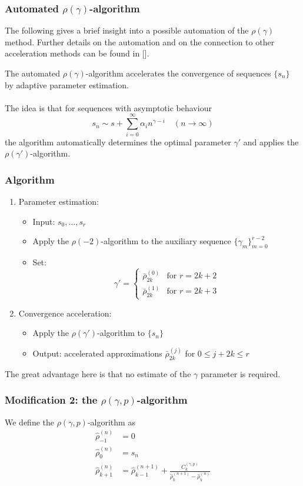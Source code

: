 \documentclass[a4paper,12pt]{article}
\numberwithin{equation}{section}
\theoremstyle{remark}
\begin{document}
\subsubsection{Automated $\rho(\gamma)$-algorithm}
The following gives a brief insight into a possible automation of the $\rho(\gamma)$ method. Further details on the automation and on the connection to other acceleration methods can be found in [\cite[378]{sidi2003practical}].

The automated $\rho(\gamma)$-algorithm accelerates the convergence of sequences $\{s_n\}$ by adaptive parameter estimation.\\\\
The idea is that for sequences with asymptotic behaviour
\[ s_n \sim s + \sum_{i=0}^\infty \alpha_i n^{\gamma-i} \quad (n\to\infty) \]
the algorithm automatically determines the optimal parameter $\gamma'$ and applies the $\rho(\gamma')$-algorithm.

\subsubsection*{Algorithm}
\begin{enumerate}
\item {Parameter estimation}:
\begin{itemize}
\item Input: $s_0,\ldots,s_r$
\item Apply the $\rho(-2)$-algorithm to the auxiliary sequence $\{\gamma_m\}_{m=0}^{r-2}$
\item Set:
  \[ \gamma' = \begin{cases}
  \bar{\rho}_{2k}^{(0)} & \text{for } r=2k+2 \\
  \bar{\rho}_{2k}^{(1)} & \text{for } r=2k+3
  \end{cases} \]
\end{itemize}

\item {Convergence acceleration}:
\begin{itemize}
\item Apply the $\rho(\gamma')$-algorithm to $\{s_n\}$
\item Output: accelerated approximations $\bar{\rho}_{2k}^{(j)}$ for $0\leq j+2k\leq r$
\end{itemize}
\end{enumerate}
The great advantage here is that no estimate of the $\gamma$ parameter is required.


\subsubsection{Modification 2: the $\rho(\gamma,p)$-algorithm}\label{subsubsec:mod2}
We define the $\rho(\gamma,p)$-algorithm as
\begin{align*}
\hat\rho^{(n)}_{-1} &= 0 \quad\\
\hat\rho^{(n)}_0 &= s_n \\
\hat\rho^{(n)}_{k+1} &= \hat\rho^{(n+1)}_{k-1} + \frac{C_k^{(\gamma,p)}}{\hat\rho^{(n+1)}_{k} - \hat\rho^{(n)}_k}
\end{align*}
\end{document}

